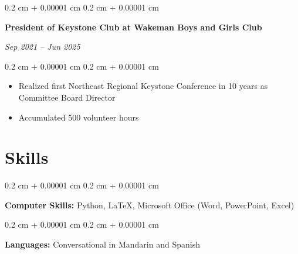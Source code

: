 \documentclass[10pt, letterpaper]{article}
\newenvironment{highlights}{
    \begin{itemize}[
        topsep=0.10 cm,
        parsep=0.10 cm,
        partopsep=0pt,
        itemsep=0pt,
        leftmargin=0.4 cm + 10pt
    ]
}{
    \end{itemize}
} %
\newenvironment{onecolentry}{
    \begin{adjustwidth}{
        0.2 cm + 0.00001 cm
    }{
        0.2 cm + 0.00001 cm
    }
}{
    \end{adjustwidth}
} %
\newenvironment{twocolentry}[2][]{
    \onecolentry
    \def\secondColumn{#2}
    \setcolumnwidth{\fill, 4.5 cm}
    \begin{paracol}{2}
}{
    \switchcolumn \raggedleft \secondColumn
    \end{paracol}
    \endonecolentry
} %
\begin{document}
    \vspace{0.2 cm}
    
    \begin{twocolentry}{\textit{Sep 2021 – Jun 2025 }}{\textbf{President of Keystone Club at Wakeman Boys and Girls Club}}
    \end{twocolentry}
    
    \vspace{0.10 cm}
    
    \begin{onecolentry}
        \begin{highlights}
            \item Realized first Northeast Regional Keystone Conference in 10 years as Committee Board Director
            \item Accumulated 500 volunteer hours
        \end{highlights}
    \end{onecolentry}
    \vspace{0.2 cm}
    
    
    
    \section{Skills}



        
        \begin{onecolentry}
            \textbf{Computer Skills:} Python, LaTeX, Microsoft Office (Word, PowerPoint, Excel)
        \end{onecolentry}
        \begin{onecolentry}
            \textbf{Languages:} Conversational in Mandarin and Spanish
        \end{onecolentry}

        

    

 
        
  
   



    



        
\end{document}
